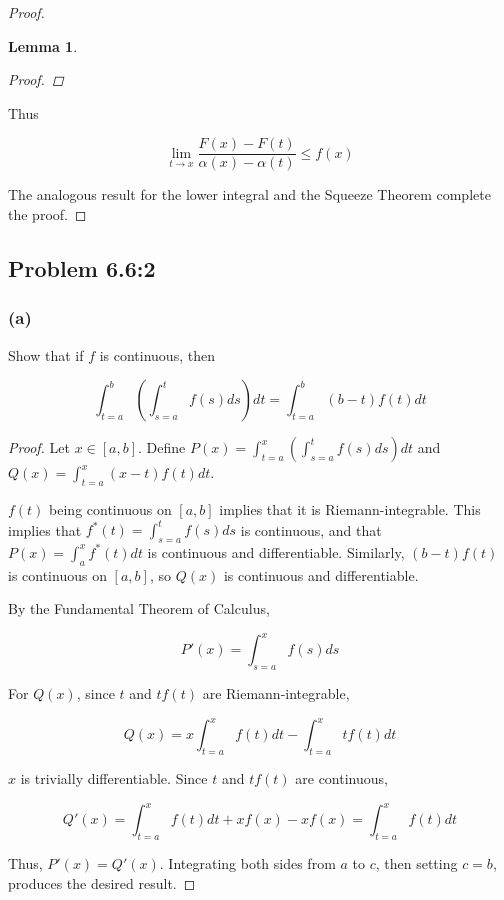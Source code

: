 \documentclass{amsart}
\newtheorem{lemma}[theorem]{Lemma}
\begin{document}
\begin{proof}
\begin{lemma}
\begin{proof}
\end{proof}
\end{lemma}

Thus

\[
\lim_{t \to x} \frac{F(x) - F(t)}{\alpha(x) - \alpha(t)} \leq f(x)
\]

The analogous result for the lower integral and the Squeeze Theorem complete the proof.

\end{proof}

\subsection*{Problem 6.6:2}

\subsubsection*{(a)}

Show that if $f$ is continuous, then

\[
\int_{t=a}^b \left(\int_{s=a}^t f(s) ds \right) dt
= \int_{t=a}^b (b-t) f(t) dt
\]

\begin{proof}

Let $x \in [a, b]$. Define $P(x) = \int_{t=a}^x \left(\int_{s=a}^t f(s) ds \right) dt$ and $Q(x) = \int_{t=a}^x (x-t) f(t) dt$.

$f(t)$ being continuous on $[a, b]$ implies that it is Riemann-integrable. This implies that $f^*(t) = \int_{s=a}^t f(s) ds$ is continuous, and that $P(x) = \int_a^x f^*(t)dt$ is continuous and differentiable. Similarly, $(b-t)f(t)$ is continuous on $[a, b]$, so $Q(x)$ is continuous and differentiable.

By the Fundamental Theorem of Calculus,

\[
P'(x) = \int_{s=a}^x f(s) ds
\]

For $Q(x)$, since $t$ and $tf(t)$ are Riemann-integrable,

\[
Q(x) = x \int_{t=a}^x f(t) dt - \int_{t=a}^x t f(t) dt
\]

$x$ is trivially differentiable. Since $t$ and $tf(t)$ are continuous,

\[
Q'(x) = \int_{t=a}^x f(t) dt + x f(x) - x f(x) = \int_{t=a}^x f(t) dt
\]

Thus, $P'(x) = Q'(x)$. Integrating both sides from $a$ to $c$, then setting $c = b$, produces the desired result.

\end{proof}
\end{document}
